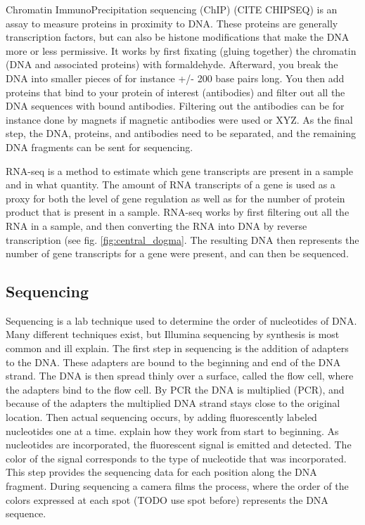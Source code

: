 Chromatin ImmunoPrecipitation sequencing (ChIP) (CITE CHIPSEQ) is an assay to measure proteins in proximity to DNA. These proteins are generally transcription factors, but can also be histone modifications that make the DNA more or less permissive. It works by first fixating (gluing together) the chromatin (DNA and associated proteins) with formaldehyde. Afterward, you break the DNA into smaller pieces of for instance +/- 200 base pairs long. You then add proteins that bind to your protein of interest (antibodies) and filter out all the DNA sequences with bound antibodies. Filtering out the antibodies can be for instance done by magnets if magnetic antibodies were used or XYZ. As the final step, the DNA, proteins, and antibodies need to be separated, and the remaining DNA fragments can be sent for sequencing.

RNA-seq is a method to estimate which gene transcripts are present in a sample and in what quantity. The amount of RNA transcripts of a gene is used as a proxy for both the level of gene regulation as well as for the number of protein product that is present in a sample. RNA-seq works by first filtering out all the RNA in a sample, and then converting the RNA into DNA by reverse transcription (see fig. \ref{fig:central_dogma}. The resulting DNA then represents the number of gene transcripts for a gene were present, and can then be sequenced.

\subsection{Sequencing}

Sequencing is a lab technique used to determine the order of nucleotides of DNA. Many different techniques exist, but Illumina sequencing by synthesis is most common and ill explain. The first step in sequencing is the addition of adapters to the DNA. These adapters are bound to the beginning and end of the DNA strand. The DNA is then spread thinly over a surface, called the flow cell, where the adapters bind to the flow cell. By PCR the DNA is multiplied (PCR), and because of the adapters the multiplied DNA strand stays close to the original location. Then actual sequencing occurs, by adding fluorescently labeled nucleotides one at a time. explain how they work from start to beginning. As nucleotides are incorporated, the fluorescent signal is emitted and detected. The color of the signal corresponds to the type of nucleotide that was incorporated. This step provides the sequencing data for each position along the DNA fragment. During sequencing a camera films the process, where the order of the colors expressed at each spot (TODO use spot before) represents the DNA sequence.

